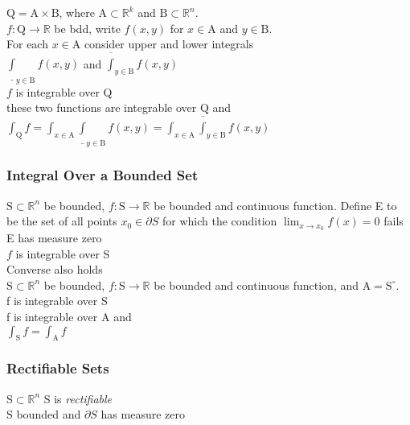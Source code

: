 \LET $\mathrm{Q}=\mathrm{A}\times\mathrm{B}$,
where $\mathrm{A}\subset\mathbb{R}^k$ and
$\mathrm{B}\subset\mathbb{R}^n$.\\
$f:\mathrm{Q}\to\mathbb{R}$ be bdd,
write $f(x,y)$ for $x\in\mathrm{A}$ and 
$y\in\mathrm{B}$.\\
For each $x\in\mathrm{A}$ consider upper and lower integrals\\
$\underline{\int}_{y\in\mathrm{B}}f(x,y)$ and
$\overline{\int}_{y\in\mathrm{B}}f(x,y)$\\
\IF $f$ is integrable over Q\\
\THEN these two functions are integrable over $\mathrm{Q}$ and
$\int_{\mathrm{Q}}f = \int_{x\in\mathrm{A}}\underline{\int}_{y\in\mathrm{B}}f(x,y) =
\int_{x\in\mathrm{A}}\overline{\int}_{y\in\mathrm{B}}f(x,y)$


\vfill
\subsubsection{Integral Over a Bounded Set}
\LET $\mathrm{S}\subset\mathbb{R}^n$ be bounded, 
$f:\mathrm{S}\to\mathbb{R}$ be bounded and continuous function.
Define E to be the set of all points $x_0\in\partial S$ for which the condition
$\lim_{x\to x_0} f(x) = 0$ fails\\
\IF E has measure zero\\
\THEN $f$ is integrable over S\\
Converse also holds\\

\LET $\mathrm{S}\subset\mathbb{R}^n$ be bounded, 
$f:\mathrm{S}\to\mathbb{R}$ be bounded and continuous function, 
and $\mathrm{A}=\mathrm{S}^{\circ}$.\\
\IF f is integrable over S\\
\THEN f is integrable over A and\\ 
$\int_{\mathrm{S}} f = \int_{\mathrm{A}}f$

\subsubsection{Rectifiable Sets}

\LET $\mathrm{S}\subset\mathbb{R}^n$
\THEN S is \textit{rectifiable} \\
\IFF S bounded and $\partial S$ has measure zero \\

